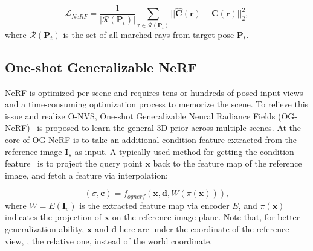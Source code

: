 \begin{equation}
    \label{eq_photometricloss}
    \mathcal{L}_{NeRF} = \frac{1}{| \mathcal{R}(\textbf{P}_t)|} \sum_{\textbf{r} \in \mathcal{R}(\textbf{P}_t)} ||\hat{\textbf{C}}(\textbf{r}) - \textbf{C}(\textbf{r})||_{2}^2 , 
\end{equation}
where $\mathcal{R}(\textbf{P}_t)$ is the set of all marched rays from target pose $\textbf{P}_t$.


\vspace{-2mm}

\subsection{\textbf{One-shot Generalizable NeRF}}
\label{sec:ognerf}
NeRF is optimized per scene and requires tens or hundreds of posed input views and a time-consuming optimization process to memorize the scene. To relieve this issue and realize O-NVS, One-shot Generalizable Neural Radiance Fields (OG-NeRF)~\cite{PixelNeRF_yu2021pixelnerf} is proposed to learn the general 3D prior across multiple scenes. At the core of OG-NeRF is to take an additional condition feature extracted from the reference image $\textbf{I}_s$ as input. A typically used method for getting the condition feature~\cite{PixelNeRF_yu2021pixelnerf,lin2023visionnerf} is to project the query point $\textbf{x}$ back to the feature map of the reference image, and fetch a feature via interpolation:

\begin{equation}
\label{eq:ognerf}
    (\sigma, \textbf{c}) = f_{ognerf}(\textbf{x}, \textbf{d}, W(\pi(\textbf{x}))),
\end{equation}
where $W=E({\textbf{I}_s})$ is the extracted feature map via encoder $E$, and $\pi(\textbf{x})$ indicates the projection of $\textbf{x}$ on the reference image plane. Note that, for better generalization ability, $\textbf{x}$ and $\textbf{d}$ here are under the coordinate of the reference view, \ie, the relative one, instead of the world coordinate. 

